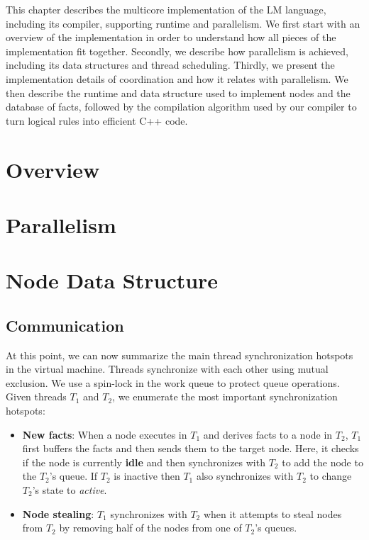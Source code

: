 This chapter describes the multicore implementation of the LM language,
including its compiler, supporting runtime and parallelism. We first start with
an overview of the implementation in order to understand how all pieces of the
implementation fit together. Secondly, we describe how parallelism is achieved,
including its data structures and thread scheduling. Thirdly, we present the
implementation details of coordination and how it relates with parallelism.  We
then describe the runtime and data structure used to implement nodes and the
database of facts, followed by the compilation algorithm used by our compiler to
turn logical rules into efficient C++ code.

\section{Overview}


\section{Parallelism}\label{sec:implementation:parallelism}


\section{Node Data Structure}\label{sec:data_structures}


\subsection{Communication}

At this point, we can now summarize the main thread synchronization hotspots in the
virtual machine. Threads synchronize with each other using mutual exclusion. We
use a spin-lock in the work queue to protect queue operations.  Given threads $T_1$
and $T_2$, we enumerate the most important synchronization hotspots:

\begin{itemize}

   \item \textbf{New facts}: When a node executes in $T_1$ and derives facts to
   a node in $T_2$, $T_1$ first buffers the facts and then sends them to the
   target node. Here, it checks if the node is currently \textbf{idle} and then
   synchronizes with $T_2$ to add the node to the $T_2$'s queue.  If $T_2$ is
   inactive  then $T_1$ also synchronizes with $T_2$ to change $T_2$'s state to
   \emph{active}.

   \item \textbf{Node stealing}: $T_1$ synchronizes with $T_2$ when it attempts
   to steal nodes from $T_2$ by removing half of the nodes from one of $T_2$'s
   queues.

\end{itemize}

